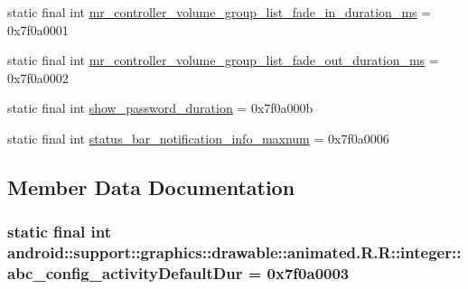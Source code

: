 \begin{CompactItemize}
\item 
static final int \hyperlink{classandroid_1_1support_1_1graphics_1_1drawable_1_1animated_1_1_r_1_1integer_0911e27ff37aa75d0170592f1b3073d8}{mr\_\-controller\_\-volume\_\-group\_\-list\_\-fade\_\-in\_\-duration\_\-ms} = 0x7f0a0001
\item 
static final int \hyperlink{classandroid_1_1support_1_1graphics_1_1drawable_1_1animated_1_1_r_1_1integer_2db79944c5ac809eb490c7333799f974}{mr\_\-controller\_\-volume\_\-group\_\-list\_\-fade\_\-out\_\-duration\_\-ms} = 0x7f0a0002
\item 
static final int \hyperlink{classandroid_1_1support_1_1graphics_1_1drawable_1_1animated_1_1_r_1_1integer_88b25d63ec396b8d30e44f2a9feb61cb}{show\_\-password\_\-duration} = 0x7f0a000b
\item 
static final int \hyperlink{classandroid_1_1support_1_1graphics_1_1drawable_1_1animated_1_1_r_1_1integer_0356c9744c8c485c0cacfca0435e34cc}{status\_\-bar\_\-notification\_\-info\_\-maxnum} = 0x7f0a0006
\end{CompactItemize}


\subsection{Member Data Documentation}
\hypertarget{classandroid_1_1support_1_1graphics_1_1drawable_1_1animated_1_1_r_1_1integer_c94a8ec52a8c23063fd8d1bc0d701866}{
\subsubsection[{abc\_\-config\_\-activityDefaultDur}]{\setlength{\rightskip}{0pt plus 5cm}static final int android::support::graphics::drawable::animated.R.R::integer::abc\_\-config\_\-activityDefaultDur = 0x7f0a0003}}
\label{classandroid_1_1support_1_1graphics_1_1drawable_1_1animated_1_1_r_1_1integer_c94a8ec52a8c23063fd8d1bc0d701866}


